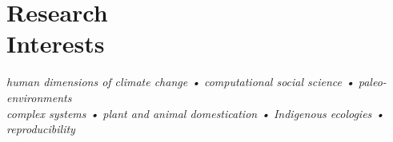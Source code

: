 \section{Research \\ Interests}

\emph{human dimensions of climate change •
computational social science •
paleo-environments\\
complex systems •
plant and animal domestication •
Indigenous ecologies •
reproducibility
}
